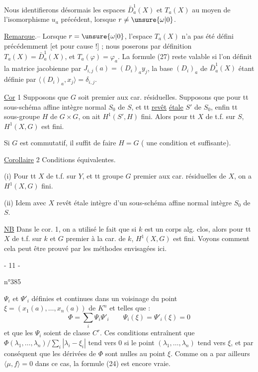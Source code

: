 Nous identifierons désormais les espaces $\bar D_a^1(X)$ et $T_a(X)$ au moyen de l'isomorphisme $u_a$ précédent, lorsque $r\neq\unsure{\omega|0}$.

\uline{Remarque}.-- Lorsque $r=\unsure{\omega|0}$, l'espace $T_a(X)$ n'a pas été défini précédemment [et pour cause !] ; nous poserons par définition $T_a(X)=\bar D_a^1(X)$, et $T_a(\varphi)=\varphi_a$. La formule (27) reste valable si l'on définit la matrice jacobienne par $J_{i,j}(a)=(D_i)_a y_j$, la base $(D_i)_a$ de $\bar D_a^1(X)$ étant définie par $\langle(D_i)_a,x_j\rangle=\delta_{i,j}$.

\uline{Cor} 1 Supposons que $G$ soit premier aux car. résiduelles.
Supposons que pour tt sous-schéma affine intègre normal $S_0$ de $S$, et tt \uline{revêt} \uline{étale} $S'$  de $S_0$, enfin tt sous-groupe $H$ de $G\times G$, on ait $H^1(S',H)$ fini.
Alors pour tt $X$ de t.f. sur $S$, $H^1(X,G)$ est fini.

Si $G$ est commutatif, il suffit de faire $H=G$ ( une condition  et suffisante).

\uline{Corollaire} 2 Conditions équivalentes.

(i) Pour tt $X$ de t.f. sur $Y$, et tt groupe  $G$ premier aux car. résiduelles de $X$, on a $H^1(X,G)$ fini.

(ii)  Idem avec $X$ revêt  étale intègre d'un sous-schéma affine normal intègre $S_0$ de $S$.

\uline{NB} Dans le cor. 1, on a utilisé le fait que si $k$ est un corps alg. clos, alors pour tt $X$ de t.f. sur $k$ et $G$ premier à la car. de $k$, $H^1(X,G)$ est fini.
Voyons comment cela peut être prouvé par les méthodes envisagées ici.

\begin{center}- 11 -\end{center}
\begin{flushright}n°385\end{flushright}
$\Psi_i$ et $\Psi'_i$ définies et continues dans un voisinage du point $\xi=(x_1(a),\ldots,x_n(a))$ de $K^n$ et telles que :
\[
\Phi=\sum_i\Psi_i\Psi'_i
\qquad \Psi_i(\xi)=\Psi'_i(\xi)=0
\]
et que les $\Psi_i$ soient de classe $C^r$. Ces conditions entraînent que
$\Phi(\lambda_1,\ldots,\lambda_n)/\sum_i|\lambda_i-\xi_i|$ tend vers $0$ si le point $(\lambda_1,\ldots,\lambda_n)$ tend vers $\xi$, et par conséquent que les dérivées de $\Phi$ sont nulles au point $\xi$. Comme on a par ailleurs $\langle\mu,f\rangle=0$ dans ce cas, la formule (24) est encore vraie.

